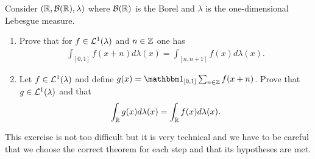 \begin{ex}
	Consider $(\mathbb{R}, \mathcal{B}(\mathbb{R}), \lambda)$ where $\mathcal{B}(\mathbb{R})$ is the Borel \siga and $\lambda$ is the one-dimensional Lebesgue measure.
	\begin{enumerate}
		\item Prove that for $f\in \mathcal{L}^1(\lambda)$ and $n\in \mathbb{Z}$ one has
		\begin{align*}
			\int_{[0,1]} f(x + n)d\lambda(x) = \int_{[n, n + 1]}f(x) d\lambda(x).
		\end{align*}
		\item Let $f \in \mathcal{L}^1(\lambda)$ and define $g(x) = \ind_{[0, 1]} \sum_{n\in \Z} f(x + n)$. Prove that $g\in \mathcal{L}^1(\lambda)$ and that
		\begin{align*}
			\int_{\mathbb{R}} g(x) d\lambda(x) = \int_{\mathbb{R}} f(x) d\lambda(x).
		\end{align*}
	\end{enumerate}
\end{ex}

This exercise is not too difficult but it is very technical and we have to be careful that we choose the correct theorem for each step and that its hypotheses are met.

